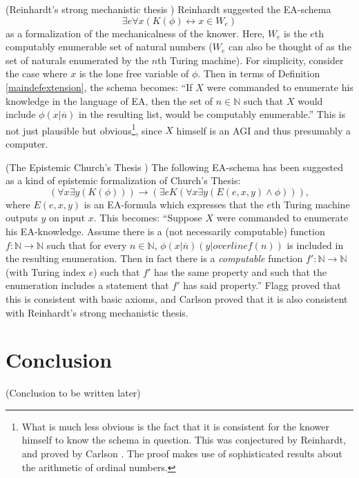 \documentclass[runningheads]{llncs}
\begin{document}
\begin{example}
    (Reinhardt's strong mechanistic thesis
    \cite{reinhardt1985absolute} \cite{reinhardt1986epistemic}
    \cite{carlson}) Reinhardt suggested the
    EA-schema
    \[\exists e \forall x ( K(\phi) \leftrightarrow x\in W_e)\]
    as a formalization of the mechanicalness of the knower. Here, $W_e$
    is the $e$th computably enumerable set of natural numbers ($W_e$ can also
    be thought of as the set of naturals enumerated by the $n$th Turing machine).
    For simplicity, consider the case where $x$ is the lone free variable
    of $\phi$. Then in terms of Definition \ref{maindefextension}, the schema
    becomes:
    ``If $X$ were commanded to enumerate his knowledge in the language of EA,
    then the set of $n\in\mathbb N$ such that $X$ would include $\phi(x|\overline n)$
    in the resulting list, would be computably enumerable.''
    This is not just plausible but obvious\footnote{What is much less obvious
    is the fact that it is consistent for the knower himself to
    know the schema in question. This was conjectured by Reinhardt, and
    proved by Carlson \cite{carlson}. The proof makes use of sophisticated results
    about the arithmetic \cite{carlson1999} of ordinal numbers.}, since $X$ himself
    is an AGI and thus presumably a computer.
\end{example}

\begin{example}
  (The Epistemic Church's Thesis \cite{flagg1985church} \cite{carlson2016collapsing})
  The following EA-schema has been suggested as a kind of epistemic formalization
  of Church's Thesis:
  \[
  ( \forall x\exists y (K(\phi))  ) \rightarrow
  ( \exists e K( \forall x\exists y ( E(e,x,y) \wedge \phi  )  )  ),
  \]
  where $E(e,x,y)$ is an EA-formula which expresses that the $e$th Turing machine
  outputs $y$ on input $x$.
  This becomes: ``Suppose $X$ were commanded to enumerate his EA-knowledge.
  Assume there is a (not necessarily computable) function
  $f:\mathbb N\to\mathbb N$ such that for every $n\in\mathbb N$,
  $\phi(x|\overline n)(y|overline{f(n)})$ is included in the resulting enumeration.
  Then in fact there is a \emph{computable}
  function $f':\mathbb N\to\mathbb N$ (with Turing index $e$)
  such that $f'$ has the same property and such that the enumeration includes
  a statement that $f'$ has said property.''
  Flagg proved \cite{flagg1985church} that this is consistent with basic axioms,
  and Carlson proved \cite{carlson2016collapsing} that it is also consistent with
  Reinhardt's strong mechanistic thesis.
\end{example}



\section{Conclusion}
\label{conclusionsection}

(Conclusion to be written later)



\end{document}
